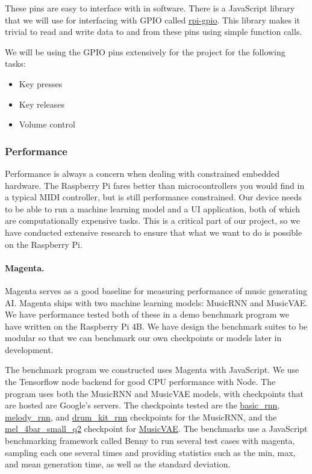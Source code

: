 These pins are easy to interface with in software. There is a JavaScript library
that we will use for interfacing with GPIO called \url{rpi-gpio}. This library makes it
trivial to read and write data to and from these pins using simple function calls.

We will be using the GPIO pins extensively for the project for the following tasks:

\begin{itemize}
  \item Key presses
  \item Key releases
  \item Volume control
\end{itemize}

\subsubsection{Performance}

Performance is always a concern when dealing with constrained embedded hardware. The
Raspberry Pi fares better than microcontrollers you would find in a typical MIDI
controller, but is still performance constrained. Our device needs to be able to run a
machine learning model and a UI application, both of which are computationally expensive
tasks. This is a critical part of our project, so we have conducted extensive research to
ensure that what we want to do is possible on the Raspberry Pi.

\paragraph{Magenta.}

Magenta serves as a good baseline for measuring performance of music generating AI.
Magenta ships with two machine learning models: MusicRNN and MusicVAE. We have performance
tested both of these in a demo benchmark program we have written on the Raspberry Pi 4B.
We have design the benchmark suites to be modular so that we can benchmark our own
checkpoints or models later in development.

The benchmark program we constructed uses Magenta with JavaScript. We use the Tensorflow
node backend for good CPU performance with Node. The program uses both the MusicRNN and
MusicVAE models, with checkpoints that are hosted are Google's servers. The checkpoints
tested are the \url{basic_rnn}, \url{melody_rnn}, and \url{drum_kit_rnn} checkpoints for
the MusicRNN, and the \url{mel_4bar_small_q2} checkpoint for \url{MusicVAE}. The benchmarks
use a JavaScript benchmarking framework called Benny to run several test cases with
magenta, sampling each one several times and providing statistics such as the min, max,
and mean generation time, as well as the standard deviation.

